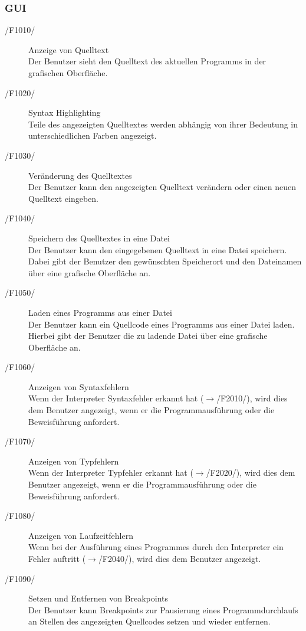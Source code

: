 \documentclass[a4paper,10pt]{article}
\begin{document}
\subsubsection{GUI}
\begin{description}
\item[/F1010/] Anzeige von Quelltext\\
Der Benutzer sieht den Quelltext des aktuellen Programms in der grafischen Oberfl\"{a}che.
\item[/F1020/] Syntax Highlighting\\
Teile des angezeigten Quelltextes werden abh\"{a}ngig von ihrer Bedeutung in unterschiedlichen Farben angezeigt.
\item[/F1030/] Ver\"{a}nderung des Quelltextes\\
Der Benutzer kann den angezeigten Quelltext ver\"{a}ndern oder einen neuen Quelltext eingeben.
\item[/F1040/] Speichern des Quelltextes in eine Datei\\
Der Benutzer kann den eingegebenen Quelltext in eine Datei speichern. Dabei gibt der Benutzer den gew\"{u}nschten Speicherort und den Dateinamen \"{u}ber eine grafische Oberfl\"{a}che an.
\item[/F1050/] Laden eines Programms aus einer Datei\\
Der Benutzer kann ein Quellcode eines Programms aus einer Datei laden. Hierbei gibt der Benutzer die zu ladende Datei \"{u}ber eine grafische Oberfl\"{a}che an.
\item[/F1060/] Anzeigen von Syntaxfehlern\\
Wenn der Interpreter Syntaxfehler erkannt hat ($\to$/F2010/), wird dies dem Benutzer angezeigt, wenn er die Programmausf\"{u}hrung oder die Beweisf\"{u}hrung anfordert.
\item[/F1070/] Anzeigen von Typfehlern\\
Wenn der Interpreter Typfehler erkannt hat ($\to$/F2020/), wird dies dem Benutzer angezeigt, wenn er die Programmausf\"{u}hrung oder die Beweisf\"{u}hrung anfordert.
\item[/F1080/] Anzeigen von Laufzeitfehlern\\
Wenn bei der Ausf\"{u}hrung eines Programmes durch den Interpreter ein Fehler auftritt ($\to$/F2040/), wird dies dem Benutzer angezeigt.
\item[/F1090/] Setzen und Entfernen von Breakpoints\\
Der Benutzer kann Breakpoints zur Pausierung eines Programmdurchlaufs an Stellen des angezeigten Quellcodes setzen und wieder entfernen.

\end{description}
\end{document}

